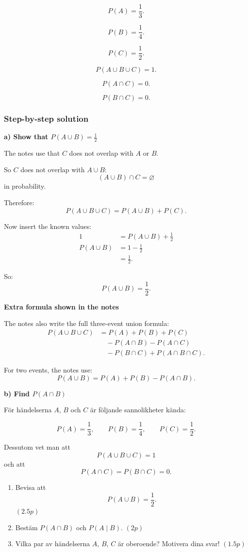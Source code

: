 \documentclass[10pt]{article}
\begin{document}
\[
P(A)=\frac{1}{3}.
\]

\[
P(B)=\frac{1}{4}.
\]

\[
P(C)=\frac{1}{2}.
\]

\[
P(A\cup B\cup C)=1.
\]

\[
P(A\cap C)=0.
\]

\[
P(B\cap C)=0.
\]

\subsubsection*{Step-by-step solution}

\textbf{a) Show that \(P(A\cup B)=\frac12\)}

The notes use that \(C\) does not overlap with
\(A\) or \(B\).

So \(C\) does not overlap with \(A\cup B\):
\[
(A\cup B)\cap C=\varnothing
\]
in probability.

Therefore:
\[
P(A\cup B\cup C)
=
P(A\cup B)+P(C).
\]

Now insert the known values:
\begin{align*}
1
&=
P(A\cup B)
+
\frac{1}{2}
\\[2mm]
P(A\cup B)
&=
1-\frac{1}{2}
\\[2mm]
&=
\frac{1}{2}.
\end{align*}

So:
\[
P(A\cup B)=\frac{1}{2}.
\]

\textbf{Extra formula shown in the notes}

The notes also write the full three-event union
formula:
\begin{align*}
P(A\cup B\cup C)
&=
P(A)+P(B)+P(C)
\\
&\quad
-P(A\cap B)
-P(A\cap C)
\\
&\quad
-P(B\cap C)
+P(A\cap B\cap C).
\end{align*}

For two events, the notes use:
\[
P(A\cup B)
=
P(A)+P(B)-P(A\cap B).
\]

\textbf{b) Find \(P(A\cap B)\)}

För händelserna \(A\), \(B\) och \(C\) är följande
sannolikheter kända:

\[
P(A)=\frac{1}{3},
\qquad
P(B)=\frac{1}{4},
\qquad
P(C)=\frac{1}{2}.
\]

Dessutom vet man att
\[
P(A\cup B\cup C)=1
\]
och att
\[
P(A\cap C)=P(B\cap C)=0.
\]

\begin{enumerate}[label=\alph*)]
\item Bevisa att
\[
P(A\cup B)=\frac{1}{2}.
\]
\hfill \((2.5p)\)

\item Bestäm \(P(A\cap B)\) och \(P(A\mid B)\).
\hfill \((2p)\)

\item Vilka par av händelserna \(A\), \(B\), \(C\)
är oberoende? Motivera dina svar!
\hfill \((1.5p)\)
\end{enumerate}
\end{document}
